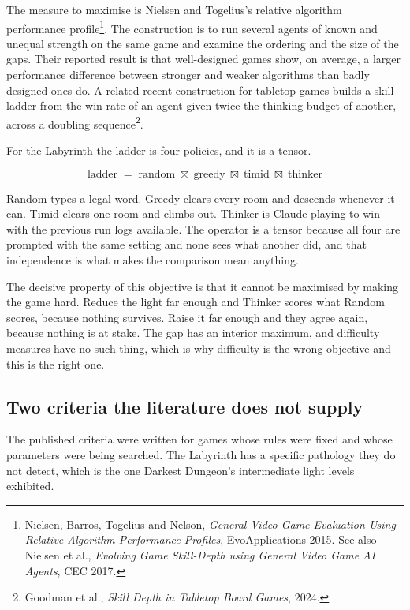 \documentclass[11pt,a4paper]{article}
\begin{document}
The measure to maximise is Nielsen and Togelius's relative algorithm performance
profile\footnote{Nielsen, Barros, Togelius and Nelson, \emph{General Video Game Evaluation Using
Relative Algorithm Performance Profiles}, EvoApplications 2015. See also Nielsen et al.,
\emph{Evolving Game Skill-Depth using General Video Game AI Agents}, CEC 2017.}. The construction
is to run several agents of known and unequal strength on the same game and examine the ordering
and the size of the gaps. Their reported result is that well-designed games show, on average, a
larger performance difference between stronger and weaker algorithms than badly designed ones
do. A related recent construction for tabletop games builds a skill ladder from the win rate of
an agent given twice the thinking budget of another, across a doubling
sequence\footnote{Goodman et al., \emph{Skill Depth in Tabletop Board Games}, 2024.}.

For the Labyrinth the ladder is four policies, and it is a tensor.

\[ \text{ladder} \;=\; \text{random} \;\boxtimes\; \text{greedy} \;\boxtimes\; \text{timid} \;\boxtimes\; \text{thinker} \]

Random types a legal word. Greedy clears every room and descends whenever it can. Timid clears
one room and climbs out. Thinker is Claude playing to win with the previous run logs available.
The operator is a tensor because all four are prompted with the same setting and none sees what
another did, and that independence is what makes the comparison mean anything.

\begin{sectionbox}
The decisive property of this objective is that it cannot be maximised by making the game hard.
Reduce the light far enough and Thinker scores what Random scores, because nothing survives.
Raise it far enough and they agree again, because nothing is at stake. The gap has an interior
maximum, and difficulty measures have no such thing, which is why difficulty is the wrong
objective and this is the right one.
\end{sectionbox}

\subsection{Two criteria the literature does not supply}
\label{sec:new}

The published criteria were written for games whose rules were fixed and whose parameters were
being searched. The Labyrinth has a specific pathology they do not detect, which is the one
Darkest Dungeon's intermediate light levels exhibited.
\end{document}
